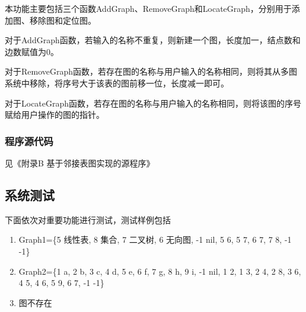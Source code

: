\documentclass[supercite]{Experimental_Report}
\theoremstyle{definition}
\begin{document}
本功能主要包括三个函数AddGraph、RemoveGraph和LocateGraph，分别用于添加图、移除图和定位图。

对于AddGraph函数，若输入的名称不重复，则新建一个图，长度加一，结点数和边数赋值为0。

对于RemoveGraph函数，若存在图的名称与用户输入的名称相同，则将其从多图系统中移除，将序号大于该表的图前移一位，长度减一即可。

对于LocateGraph函数，若存在图的名称与用户输入的名称相同，则将该图的序号赋给用户操作的图的指针。

\subsubsection{程序源代码}
见《附录B 基于邻接表图实现的源程序》


\newpage


\subsection{系统测试}

下面依次对重要功能进行测试，测试样例包括
\begin{enumerate}
	\item Graph1=\{5 线性表, 8 集合, 7 二叉树, 6 无向图, -1 nil, 5 6, 5 7, 6 7, 7 8, -1 -1\}
	\item Graph2=\{1 a, 2 b, 3 c, 4 d, 5 e, 6 f, 7 g, 8 h, 9 i, -1 nil, 1 2, 1 3, 2 4, 2 8, 3 6, 4 5, 4 6, 5 9, 6 7, -1 -1\}
	\item 图不存在
\end{enumerate}

\newpage
\end{document}
